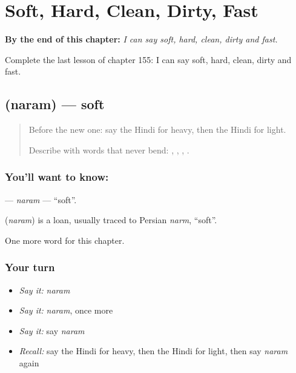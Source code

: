 
\chapter{Soft, Hard, Clean, Dirty, Fast}
\label{ch:hi-soft-hard-clean-dirty-fast}

\begin{chapteropening}
\textbf{By the end of this chapter:} \emph{I can say soft, hard, clean, dirty and fast.}

Complete the last lesson of chapter 155: I can say soft, hard, clean, dirty and fast.
\end{chapteropening}

\section[\texorpdfstring{\hi{नरम} (naram)}{नरम (naram)}]{ (naram) — soft}

\label{lesson:HI-C155-naram}



\begin{quote}
Before the new one: say the Hindi for heavy, then the Hindi for light.

Describe with words that never bend: \textbf{}, \textbf{}, \textbf{}, \textbf{}.
\end{quote}

\subsection*{You'll want to know: }
\textbf{} — \emph{naram} — \textquotedblleft{}soft\textquotedblright{}.

\begin{cousinweb}
\textbf{} (\emph{naram}) is a loan, usually traced to Persian \emph{narm}, \textquotedblleft{}soft\textquotedblright{}.
\end{cousinweb}

\begin{grammarlens}[title={What you've built}]
One more word for this chapter.
\end{grammarlens}

\subsection*{Your turn}
\begin{itemize}
\raggedright
  \item \emph{Say it:} \emph{naram}
  \item \emph{Say it:} \emph{naram}, once more
  \item \emph{Say it:} say \emph{naram}
  \item \emph{Recall:} say the Hindi for heavy, then the Hindi for light, then say \emph{naram} again
\end{itemize}

